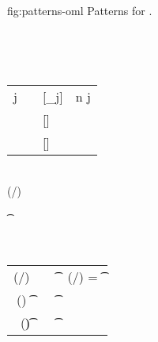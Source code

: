 \documentclass[acmsmall,screen,nonacm,review]{acmart}
\begin{document}
\begin{mathparfig}
  {fig:patterns-oml}
  {Patterns for \OML.}
  \begin{bnfgrammar}
    \\
    \entry[Constraints]{\c}{
      \dots
      \and \labenv(\elab/\ct) \leq \ta \to \tb
      \and \labenv(\elab/\T) \leq \ta \to \tb
      \andcr \cscm \leq \t
      \and \ts \leq \t
      \andcr \x \leq \cscm
      \and \x \leq \ts
    }
 \end{bnfgrammar}
  \\
  \newcommand{\Mrule}[5][]{{#2} \Matches {(#3)} \; #4 &\eqdef& {#5} & #1}
  \begin{tabular}{RCLL}
    \Mrule[ n \geq j]
      {\cpatprod \tv j}
      {\any \tvcs \Pi\iton \tvcs} \tvbs
      {[\tv \is \tvb_j]}
    \\[1ex]
    \Mrule
      {\cpatrcd \ct}
      {\any \tvcs \Tapp} \tvbs
      {[\ct \is \T]}
    \\[1ex]
    \Mrule
      {\cpatpoly \cscm}
      {\any \tvcs \tpoly \ts} \tvbs
      {[\cscm \is \ts \where{\tvcs \is \tvbs}]}
  \end{tabular}
  \\
    {\semenv \th \labenv(\elab/\ct) \leq \ta \to \tb}

    {\semenv \th \cscm \leq \t}

    {\semenv \th \x \leq \cscm}
  \\
  \newcommand{\Srule}[3][]{{#2} &\eqdef& {#3} & {#1}}
  \begin{tabular}{RCLL}
    \Srule[ \labenv(\elab/\T) = \tfor \tvs \t \to \Tapp \tvs]
      {\labenv(\elab/\T) \leq \ta \to \tb}
      {\cexists \tvs \cunif \ta \t \cand \cunif \tb {\Tapp \tvs}}
    \\[1ex]
    \Srule
      {(\tfor \tvs \tp) \leq \t}
      {\cexists \tvs \cunif \tp \t}
    \\[1ex]
    \Srule
      {\x \leq (\tfor \tvs \t)}
      {\cfor \tvs \capp \x \t}
  \end{tabular}

\end{mathparfig}


\end{document}

